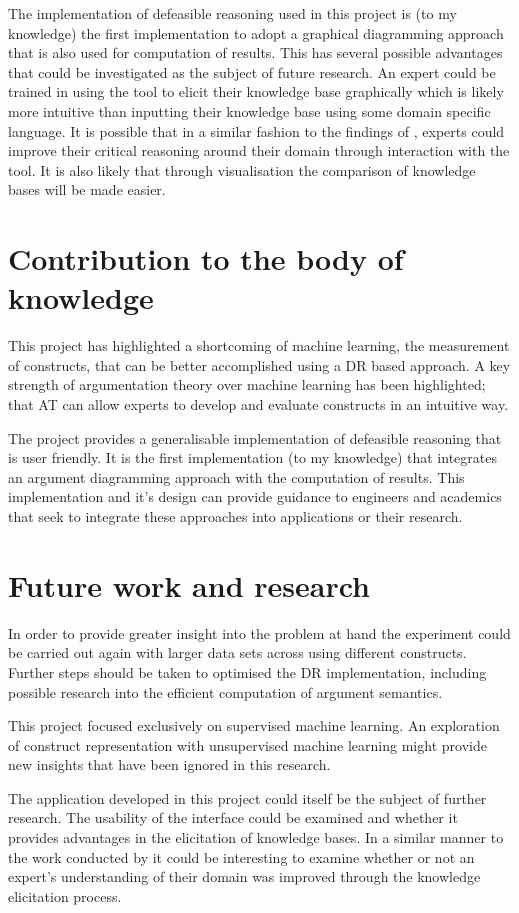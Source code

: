 The implementation of defeasible reasoning used in this project is (to my knowledge) the first implementation to adopt a graphical diagramming approach that is also used for computation of results. This has several possible advantages that could be investigated as the subject of future research. An expert could be trained in using the tool to elicit their knowledge base graphically which is likely more intuitive than inputting their knowledge base using some domain specific language. It is possible that in a similar fashion to the findings of \cite{twardy2004argument}, experts could improve their critical reasoning around their domain through interaction with the tool. It is also likely that through visualisation the comparison of knowledge bases will be made easier. 


\section{Contribution to the body of knowledge}

This project has highlighted a shortcoming of machine learning, the measurement of constructs, that can be better accomplished using a DR based approach. A key strength of argumentation theory over machine learning has been highlighted; that AT can allow experts to develop and evaluate constructs in an intuitive way.

The project provides a generalisable implementation of defeasible reasoning that is user friendly. It is the first implementation (to my knowledge) that integrates an argument diagramming approach with the computation of results. This implementation and it's design can provide guidance to engineers and academics that seek to integrate these approaches into applications or their research.

\section{Future work and research}

In order to provide greater insight into the problem at hand the experiment could be carried out again with larger data sets across using different constructs. Further steps should be taken to optimised the DR implementation, including possible research into the efficient computation of argument semantics.

This project focused exclusively on supervised machine learning. An exploration of construct representation with unsupervised machine learning might provide new insights that have been ignored in this research.

The application developed in this project could itself be the subject of further research. The usability of the interface could be examined and whether it provides advantages in the elicitation of knowledge bases. In a similar manner to the work conducted by \cite{twardy2004argument} it could be interesting to examine whether or not an expert's understanding of their domain was improved through the knowledge elicitation process.
